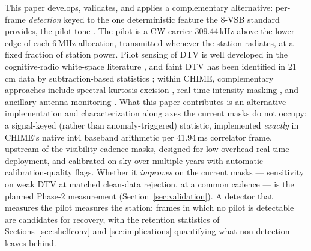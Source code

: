 This paper develops, validates, and applies a complementary alternative:
per-frame \emph{detection} keyed to the one deterministic feature the 8-VSB
standard provides, the pilot tone \citep{atsc_a53}. The pilot is a CW
carrier 309.44\,kHz above the lower edge of each 6\,MHz allocation,
transmitted whenever the station radiates, at a fixed fraction of station
power. Pilot sensing of DTV is well developed in the cognitive-radio
white-space literature \citep[e.g.][]{hwang2013dtv}, and faint DTV has been
identified in 21\,cm data by subtraction-based statistics
\citep{wilensky2019ssins}; within CHIME, complementary approaches include
spectral-kurtosis excision \citep{taylor2019kurtosis}, real-time intensity
masking \citep{rafieiravandi2023rfi}, and ancillary-antenna monitoring
\citep{metzger2026ancillary}. What this paper contributes is an
alternative implementation and characterization along axes the current
masks do not occupy: a signal-keyed (rather than anomaly-triggered)
statistic, implemented \emph{exactly} in CHIME's native int4 baseband
arithmetic per 41.94\,ms correlator frame, upstream of the
visibility-cadence masks, designed for low-overhead real-time deployment,
and calibrated on-sky over multiple years with automatic
calibration-quality flags. Whether it \emph{improves} on the current
masks --- sensitivity on weak DTV at matched clean-data rejection, at a
common cadence --- is the planned Phase-2 measurement
(Section~\ref{sec:validation}). A
detector that measures the pilot measures the station: frames in which no
pilot is detectable are candidates for recovery, with the retention
statistics of Sections~\ref{sec:shelfconv} and \ref{sec:implications}
quantifying what non-detection leaves behind.


